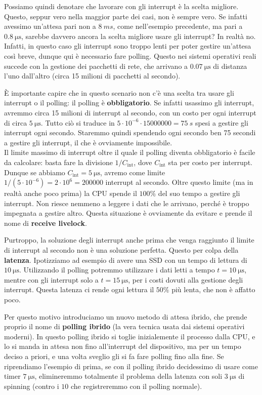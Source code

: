 \documentclass[11pt, a4paper, titlepage, oneside]{scrbook}
\begin{document}
Possiamo quindi denotare che lavorare con gli interrupt è la scelta migliore. Questo, seppur vero nella maggior parte dei casi, non è sempre vero. Se infatti avessimo un'attesa pari non a $\SI{8}{ms}$, come nell'esempio precedente, ma pari a $\SI{0.8}{\micro\second}$, sarebbe davvero ancora la scelta migliore usare gli interrupt? In realtà no. Infatti, in questo caso gli interrupt sono troppo lenti per poter gestire un'attesa così breve, dunque qui è necessario fare polling. Questo nei sistemi operativi reali succede con la gestione dei pacchetti di rete, che arrivano a $\SI{0.07}{\micro\second}$ di distanza l'uno dall'altro (circa 15 milioni di pacchetti al secondo). 

È importante capire che in questo scenario non c'è una scelta tra usare gli interrupt o il polling: il polling è \textbf{obbligatorio}. Se infatti usassimo gli interrupt, avremmo circa 15 milioni di interrupt al secondo, con un costo per ogni interrupt di circa $\SI{5}{\micro\second}$. Tutto ciò si traduce in $5 \cdot 10^{-6} \cdot 15000000 = \SI{75}{s}$ spesi a gestire gli interrupt ogni secondo. Staremmo quindi spendendo ogni secondo ben 75 secondi a gestire gli interrupt, il che è ovviamente impossibile. \\ 
Il limite massimo di interrupt oltre il quale il polling diventa obbligatorio è facile da calcolare: basta fare la divisione $1/C_{\text{int}}$, dove $C_{\text{int}}$ sta per costo per interrupt. Dunque se abbiamo $C_\text{int} = \SI{5}{\micro\second}$, avremo come limite $1/(5 \cdot 10^{-6}) = 2 \cdot 10^6 = 200000$ interrupt al secondo. Oltre questo limite (ma in realtà anche poco prima) la CPU spende il $100\%$ del suo tempo a gestire gli interrupt. Non riesce nemmeno a leggere i dati che le arrivano, perché è troppo impegnata a gestire altro. Questa situazione è ovviamente da evitare e prende il nome di \textbf{receive livelock}.

Purtroppo, la soluzione degli interrupt anche prima che venga raggiunto il limite di interrupt al secondo non è una soluzione perfetta. Questo per colpa della \textbf{latenza}. Ipotizziamo ad esempio di avere una SSD con un tempo di lettura di $\SI{10}{\micro\second}$. Utilizzando il polling potremmo utilizzare i dati letti a tempo $t = \SI{10}{\micro\second}$, mentre con gli interrupt solo a $t = \SI{15}{\micro\second}$, per i costi dovuti alla gestione degli interrupt. Questa latenza ci rende ogni lettura il $50\%$ più lenta, che non è affatto poco. 

Per questo motivo introduciamo un nuovo metodo di attesa ibrido, che prende proprio il nome di \textbf{polling ibrido} (la vera tecnica usata dai sistemi operativi moderni).
In questo polling ibrido si toglie inizialemente il processo dalla CPU, e lo si manda in attesa non fino all'interrupt del dispositivo, ma per un tempo deciso a priori, e una volta sveglio gli si fa fare polling fino alla fine. Se riprendiamo l'esempio di prima, se con il polling ibrido decidessimo di usare come timer $\SI{7}{\micro\second}$, elimineremmo totalmente il problema della latenza con soli $\SI{3}{\micro\second}$ di spinning (contro i $10$ che registreremmo con il polling normale). 
\end{document}
